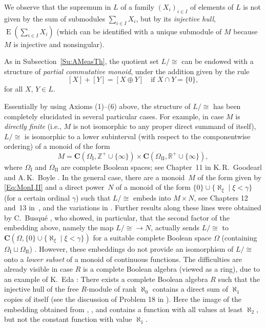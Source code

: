 \documentclass[psamsfonts,reqno]{memo-l}
\theoremstyle{plain}
\theoremstyle{definition}
\theoremstyle{remark}
\numberwithin{equation}{section}
\newcommand{\CC}{\mathbf{C}}
\DeclareMathOperator{\rE}{E}
\newcommand{\I}{\mathrm{I}}
\newcommand{\II}{\mathrm{II}}
\newcommand{\ZZ}{\mathbb{Z}}
\newcommand{\RR}{\mathbb{R}}
\newcommand{\pcm}{partial commutative mon\-oid}
\newcommand{\set}[1]{\{#1\}}
\newcommand{\setm}[2]{\set{#1\mid#2}}
\newcommand{\famm}[2]{(#1)_{#2}}
\begin{document}
We observe that the supremum in $L$ of a family $\famm{X_i}{i\in I}$ of
elements of $L$ is not given by the sum of submodules $\sum_{i\in I}X_i$, but
by its \emph{injective hull},\index{ErzzE@$\rE(M)$}
$\rE\left(\sum_{i\in I}X_i\right)$ (which can be identified with a unique
submodule of $M$ because $M$ is injective and nonsingular).

As in Subsection~\ref{Su:AMeasTh}, the quotient set $L/{\cong}$ can be endowed
with a structure of \emph{\pcm}, under
the addition given by the rule
   \[
   [X]+[Y]=[X\oplus Y]\quad\text{if }X\cap Y=\set{0},
   \]
for all $X$, $Y\in L$.

Essentially by using Axioms (1)--(6) above, the structure of $L/{\cong}$
has been completely elucidated in several particular cases. For example, in
case $M$ is \emph{directly finite}
(i.e., $M$ is not isomorphic to any
proper direct summand of itself), $L/{\cong}$ is isomorphic to a lower
subinterval (with respect to the componentwise ordering) of a monoid of the
form
   \begin{equation}\label{Eq:MonI,II}
   M=\CC(\Omega_{\I},\ZZ^+\cup\set{\infty})\times
   \CC(\Omega_{\II},\RR^+\cup\set{\infty}),
   \end{equation}
where $\Omega_{\I}$ and $\Omega_{\II}$ are complete Boolean spaces;
 see %
Chapter~11 in K.\,R.~Goodearl and A.\,K.~Boyle \cite{GoBo}. In the general
case, there are a monoid~$M$ of the form given by \eqref{Eq:MonI,II} and a
direct power~$N$ of a monoid of the form
$\set{0}\cup\setm{\aleph_\xi}{\xi<\gamma}$ (for a certain ordinal $\gamma$)
such that $L/{\cong}$ embeds into $M\times N$, see Chapters 12 and~13
%
in~\cite{GoBo}, and the variations in 
\cite[Chapter 12]{GvnRR}. Further results along these lines were obtained by
C.~Busqu\'e 
\cite{Busq90}, who showed, in particular, that the second factor of the
embedding above, namely the map $L/{\cong} \rightarrow N$, actually sends
$L/{\cong}$ to $\CC(\Omega, \set{0}\cup\setm{\aleph_\xi}{\xi<\gamma})$
for a suitable complete Boolean space $\Omega$
(containing $\Omega_{\I}\sqcup\Omega_{\II}$)
\cite[Proposition~4.7]{Busq90}. However, these
embeddings do not provide an isomorphism of
$L/{\cong}$ onto a \emph{lower subset} of a monoid of continuous functions.
The difficulties are already visible in case $R$ is a complete Boolean algebra
(viewed as a ring), due to an example of K.~Eda \cite{Eda84}:
There exists a complete Boolean algebra
$R$ such that the injective hull of the free
$R$-module of rank $\aleph_0$ contains a direct sum of $\aleph_1$ copies of
itself (see the discussion of Problem 18 in \cite[p.~374]{GvnRR}).
 Here the
image of the embedding obtained from \cite{GoBo},
%
\cite{GvnRR}, and
\cite{Busq90} contains a function with all values at
least $\aleph_2$, but not the constant function with value $\aleph_1$.
\end{document}
